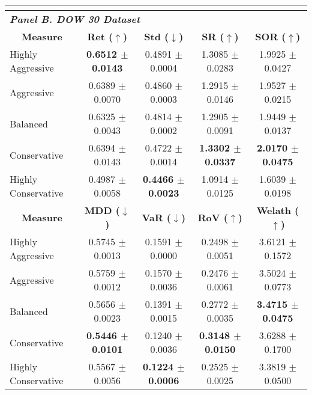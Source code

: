 {\begin{tabular}{lcccc}
\multicolumn{5}{l}{}                                                                                                                                             \\ \hline
\multicolumn{5}{l}{\textit{\textbf{Panel B. DOW 30 Dataset}}}                                                                                                    \\
\multicolumn{1}{c}{\textbf{Measure}} & \textbf{Ret ($\uparrow$)}    & \textbf{Std ($\downarrow$)}  & \textbf{SR ($\uparrow$)}     & \textbf{SOR ($\uparrow$)}    \\ \hline
Highly Aggressive                    & \textbf{0.6512 $\pm$ 0.0143} & 0.4891 $\pm$ 0.0004          & 1.3085 $\pm$ 0.0283          & 1.9925 $\pm$ 0.0427          \\
Aggressive                           & 0.6389 $\pm$ 0.0070          & 0.4860 $\pm$ 0.0003          & 1.2915 $\pm$ 0.0146          & 1.9527 $\pm$ 0.0215          \\
Balanced                             & 0.6325 $\pm$ 0.0043          & 0.4814 $\pm$ 0.0002          & 1.2905 $\pm$ 0.0091          & 1.9449 $\pm$ 0.0137          \\
Conservative                         & 0.6394 $\pm$ 0.0143          & 0.4722 $\pm$ 0.0014          & \textbf{1.3302 $\pm$ 0.0337} & \textbf{2.0170 $\pm$ 0.0475} \\
Highly Conservative                  & 0.4987 $\pm$ 0.0058          & \textbf{0.4466 $\pm$ 0.0023} & 1.0914 $\pm$ 0.0125          & 1.6039 $\pm$ 0.0198          \\ \hline
\multicolumn{1}{c}{\textbf{Measure}} & \textbf{MDD ($\downarrow$)}  & \textbf{VaR ($\downarrow$)}  & \textbf{RoV ($\uparrow$)}    & \textbf{Welath ($\uparrow$)} \\ \hline
Highly Aggressive                    & 0.5745 $\pm$ 0.0013          & 0.1591 $\pm$ 0.0000          & 0.2498 $\pm$ 0.0051          & 3.6121 $\pm$ 0.1572          \\
Aggressive                           & 0.5759 $\pm$ 0.0012          & 0.1570 $\pm$ 0.0036          & 0.2476 $\pm$ 0.0061          & 3.5024 $\pm$ 0.0773          \\
Balanced                             & 0.5656 $\pm$ 0.0023          & 0.1391 $\pm$ 0.0015          & 0.2772 $\pm$ 0.0035          & \textbf{3.4715 $\pm$ 0.0475} \\
Conservative                         & \textbf{0.5446 $\pm$ 0.0101} & 0.1240 $\pm$ 0.0036          & \textbf{0.3148 $\pm$ 0.0150} & 3.6288 $\pm$ 0.1700          \\
Highly Conservative                  & 0.5567 $\pm$ 0.0056          & \textbf{0.1224 $\pm$ 0.0006} & 0.2525 $\pm$ 0.0025          & 3.3819 $\pm$ 0.0500          \\ \hline
\end{tabular}}

